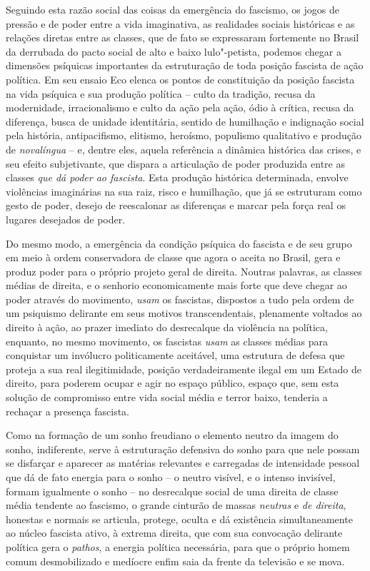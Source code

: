 Seguindo esta razão social das coisas da emergência do fascismo, os
jogos de pressão e de poder entre a vida imaginativa, as realidades
sociais históricas e as relações diretas entre as classes, que de fato
se expressaram fortemente no Brasil da derrubada do pacto social de alto
e baixo lulo"-petista, podemos chegar a dimensões psíquicas importantes
da estruturação de toda posição fascista de ação política. Em seu ensaio
Eco elenca os pontos de constituição da posição fascista na vida
psíquica e sua produção política -- culto da tradição, recusa da
modernidade, irracionalismo e culto da ação pela ação, ódio à crítica,
recusa da diferença, busca de unidade identitária, sentido de humilhação
e indignação social pela história, antipacifismo, elitismo, heroísmo,
populismo qualitativo e produção de \emph{novalíngua} -- e, dentre eles,
aquela referência a dinâmica histórica das crises, e seu efeito
subjetivante, que dispara a articulação de poder produzida entre as
classes \emph{que dá poder ao fascista}. Esta produção histórica
determinada, envolve violências imaginárias na sua raiz, risco e
humilhação, que já se estruturam como gesto de poder, desejo de
reescalonar as diferenças e marcar pela força real os lugares desejados
de poder.

Do mesmo modo, a emergência da condição psíquica do fascista e de seu
grupo em meio à ordem conservadora de classe que agora o aceita no
Brasil, gera e produz poder para o próprio projeto geral de direita.
Noutras palavras, as classes médias de direita, e o senhorio
economicamente mais forte que deve chegar ao poder através do movimento,
\emph{usam} os fascistas, dispostos a tudo pela ordem de um psiquismo
delirante em seus motivos transcendentais, plenamente voltados ao
direito à ação, ao prazer imediato do desrecalque da violência na
política, enquanto, no mesmo movimento, os fascistas \emph{usam} as
classes médias para conquistar um invólucro politicamente aceitável, uma
estrutura de defesa que proteja a sua real ilegitimidade, posição
verdadeiramente ilegal em um Estado de direito, para poderem ocupar e
agir no espaço público, espaço que, sem esta solução de compromisso
entre vida social média e terror baixo, tenderia a rechaçar a presença
fascista.

Como na formação de um sonho freudiano o elemento neutro da imagem do
sonho, indiferente, serve à estruturação defensiva do sonho para que
nele possam se disfarçar e aparecer as matérias relevantes e carregadas
de intensidade pessoal que dá de fato energia para o sonho -- o neutro
visível, e o intenso invisível, formam igualmente o sonho -- no
desrecalque social de uma direita de classe média tendente ao fascismo,
o grande cinturão de massas \emph{neutras} e \emph{de direita}, honestas
e normais se articula, protege, oculta e dá existência simultaneamente
ao núcleo fascista ativo, à extrema direita, que com sua convocação
delirante política gera o \emph{pathos}, a energia política necessária,
para que o próprio homem comum desmobilizado e medíocre enfim saia da
frente da televisão e se mova.

